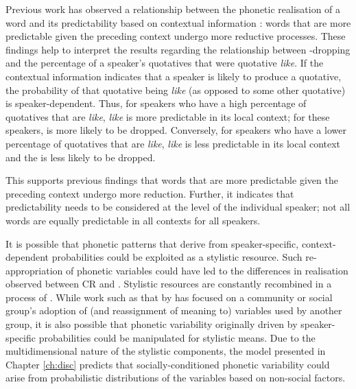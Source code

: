 Previous work has observed a relationship between the phonetic realisation of a word and its predictability based on contextual information \citep{jurafskyetal2002}: words that are more predictable given the preceding context undergo more reductive processes. These findings help to interpret the results regarding the relationship between -dropping and the percentage of a speaker's quotatives that were quotative \textit{like}. If the contextual information indicates that a speaker is likely to produce a quotative, the probability of that quotative being \textit{like} (as opposed to some other quotative) is speaker-dependent. Thus, for speakers who have a high percentage of quotatives that are \textit{like}, \textit{like} is more predictable in its local context; for these speakers,  is more likely to be dropped. Conversely, for speakers who have a lower percentage of quotatives that are \textit{like}, \textit{like} is less predictable in its local context and the  is less likely to be dropped.

This supports previous findings that words that are more predictable given the preceding context undergo more reduction. Further, it indicates that predictability needs to be considered at the level of the individual speaker; not all words are equally predictable in all contexts for all speakers.


\largerpage
It is possible that phonetic patterns that derive from speaker-specific, context-dependent probabilities could be exploited as a stylistic resource. Such re-ap\-pro\-pri\-a\-tion of phonetic variables could have led to the differences in  realisation observed between CR and . Stylistic resources are constantly recombined in a process of  \citep{hebdige1984,eckert2008}. While work such as that by \citet{milroymilroy1978} has focused on a community or social group's adoption of (and reassignment of meaning to) variables used by another group, it is also possible that phonetic variability originally driven by speaker-specific probabilities could be manipulated for stylistic means. Due to the multidimensional nature of the stylistic components, the model presented in Chapter \ref{ch:disc} predicts that socially-conditioned phonetic variability could arise from probabilistic distributions of the variables based on non-social factors.




